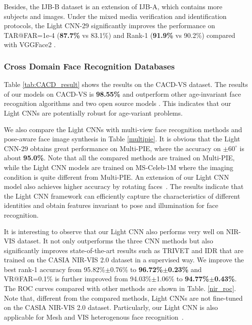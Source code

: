 \documentclass[journal,transmag]{IEEEtran}
\begin{document}
Besides, the IJB-B dataset is an extension of IJB-A, which contains more subjects and images. Under the mixed media verification and identification protocols, the Light CNN-29 significantly improves the performance on TAR@FAR=1e-4 (\textbf{87.7\%} vs 83.1\%) and Rank-1 (\textbf{91.9\%} vs 90.2\%) compared with VGGFace2 \cite{DBLP:journals/corr/abs-1710-08092}.


\subsubsection{Cross Domain Face Recognition Databases}
Table \ref{tab:CACD_result} shows the results on the CACD-VS dataset. The results of our models on CACD-VS is \textbf{98.55\%} and outperform other age-invariant face recognition algorithms \cite{DBLP:journals/tmm/ChenCH15,chen2013blessing,DBLP:conf/iccv/GongLLLT13} and two open source models \cite{parkhi2015deep, liu2016viplfacenet}. This indicates that our Light CNNs are potentially robust for age-variant problems.

We also compare the Light CNNs with multi-view face recognition methods \cite{DBLP:conf/cvpr/KanSC16, DBLP:conf/iccv/ZhuLWT13, DBLP:conf/nips/ZhuLWT14, DBLP:journals/corr/YinL17} and pose-aware face image synthesis \cite{LuanCVPR17, DBLP:conf/cvpr/YimJYCPK15} in Table \ref{multipie}. It is obvious that the Light CNN-29 obtains great performance on Multi-PIE, where the accuracy on $\pm60^{\circ}$ is about \textbf{95.0\%}. Note that all the compared methods are trained on Multi-PIE, while the Light CNN models are trained on MS-Celeb-1M where the imaging condition is quite different from Multi-PIE. An extension of our Light CNN model also achieves higher accuracy by rotating faces~\cite{RHuang:2017, yibohucvpr2018}. The results indicate that the Light CNN framework can efficiently capture the characteristics of different identities and obtain features invariant to pose and illumination for face recognition.

It is interesting to observe that our Light CNN also performs very well on NIR-VIS dataset. It not only outperforms the three CNN methods but also significantly improves state-of-the-art results such as TRIVET  \cite{DBLP:conf/icb/LiuSWT16} and IDR \cite{DBLP:conf/aaai/RanIDR17} that are trained on the CASIA NIR-VIS 2.0 dataset in a supervised way. We improve the best rank-1 accuracy from 95.82\%$\pm$0.76\% to \textbf{96.72\%$\pm$0.23\%} and VR@FAR=0.1\% is further improved from 94.03\%$\pm$1.06\% to \textbf{94.77\%$\pm$0.43\%}. The ROC curves compared with other methods are shown in Table. \ref{nir_roc}. Note that, different from the compared methods, Light CNNs are not fine-tuned on the CASIA NIR-VIS 2.0 dataset. Particularly, our Light CNN is also applicable for Mesh and VIS heterogenous face recognition~\cite{SZhang:2017}.
\end{document}
